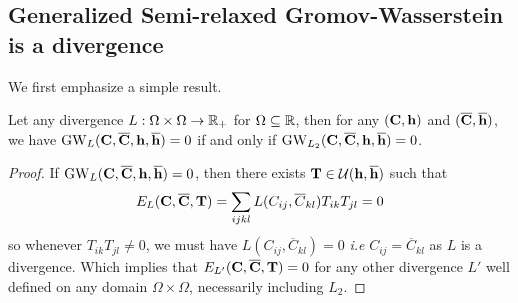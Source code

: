 \subsection{Generalized Semi-relaxed Gromov-Wasserstein is a divergence}\label{sec:srGW_divergence_supp}
We first emphasize a simple result.
\begin{proposition}\label{prop:GW_divergence}
	Let any divergence $L: \Omega \times \Omega \rightarrow \mathbb{R}_+$ for $\Omega \subseteq \mathbb{R}$, then for any $({\mathbf{C}}, {\mathbf{h}})$ and $(\overline{{\mathbf{C}}}, \overline{{\mathbf{h}}})$, we have $\operatorname{GW}_L({\mathbf{C}}, \overline{{\mathbf{C}}}, {\mathbf{h}}, \overline{{\mathbf{h}}}) = 0$ if and only if $\operatorname{GW}_{L_2}({\mathbf{C}}, \overline{{\mathbf{C}}}, {\mathbf{h}}, \overline{{\mathbf{h}}}) = 0$. 
\end{proposition}
\begin{proof}
	If $\operatorname{GW}_L({\mathbf{C}}, \overline{{\mathbf{C}}}, {\mathbf{h}}, \overline{{\mathbf{h}}}) = 0$, then there exists ${\mathbf{T}} \in \mathcal{U}({\mathbf{h}}, \overline{{\mathbf{h}}})$ such that 
	\begin{equation}
		E_L({\mathbf{C}}, \overline{{\mathbf{C}}}, {\mathbf{T}}) = \sum_{ijkl} L(C_{ij}, \overline{C}_{kl})T_{ik}T_{jl} = 0
	\end{equation}
	so whenever $T_{ik}T_{jl} \neq 0$, we must have $L(C_{ij}, \overline{C}_{kl}) = 0$ \emph{i.e} $C_{ij}= \overline{C}_{kl}$ as $L$ is a divergence. Which implies that $E_{L'}({\mathbf{C}}, \overline{{\mathbf{C}}}, {\mathbf{T}}) = 0$ for any other divergence $L'$ well defined on any domain $\Omega \times \Omega$, necessarily including $L_2$.
\end{proof}


